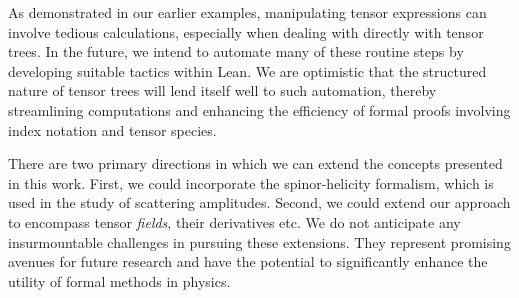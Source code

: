 \documentclass[a4paper, 11pt]{article}
\begin{document}
As demonstrated in our earlier examples, manipulating tensor expressions can involve tedious
 calculations, especially when dealing with directly with tensor trees. 
In the future, we intend to automate many of these routine steps by developing suitable tactics 
within Lean. We are optimistic that the structured nature of tensor trees will lend itself well to 
such automation, thereby streamlining computations and enhancing the efficiency of formal proofs
involving index notation and tensor species.

There are two primary directions in which we can extend the concepts presented in this work. 
First, we could incorporate the spinor-helicity formalism, which is used in the study of scattering 
amplitudes. Second, we could extend our approach to encompass tensor \emph{fields}, their derivatives
etc. We do not anticipate any insurmountable challenges in pursuing these extensions. 
They represent promising avenues for future research and have the potential to significantly enhance
the utility of formal methods in physics.
%
%


\end{document}
